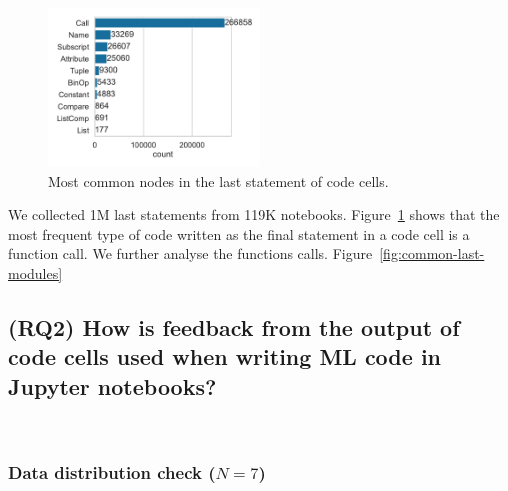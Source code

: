 \begin{figure}
  \centering
  \includegraphics[width=0.5\textwidth]{common-last-nodes.pdf}
  \caption{Most common nodes in the last statement of code cells.}
  \label{fig:common-last-nodes}
\end{figure}

We collected 1M last statements from 119K notebooks. Figure~\ref{fig:common-last-nodes} shows that the most frequent type of code written as the final statement in a code cell is a function call. We further analyse the functions calls. Figure~\ref{fig:common-last-modules}


\subsection{(RQ2) How is feedback from the output of code cells used when writing ML code in Jupyter notebooks?}~\label{sec:result-rq1}

\subsubsection{Data distribution check ($N = 7$)}~\label{sec:data-distribution-output}


